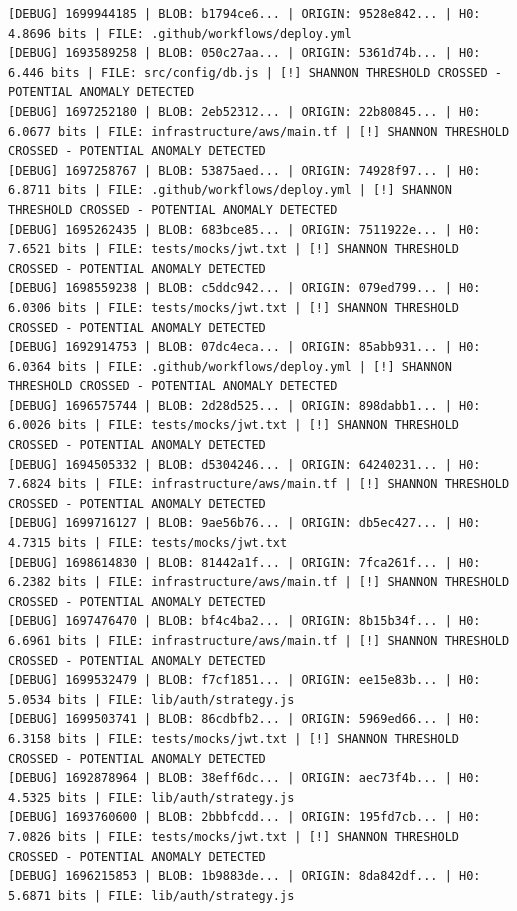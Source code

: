 \documentclass[12pt, a4paper, oneside]{report}
\begin{document}
\begin{lstlisting}[basicstyle=\tiny\ttfamily]
[DEBUG] 1699944185 | BLOB: b1794ce6... | ORIGIN: 9528e842... | H0: 4.8696 bits | FILE: .github/workflows/deploy.yml
[DEBUG] 1693589258 | BLOB: 050c27aa... | ORIGIN: 5361d74b... | H0: 6.446 bits | FILE: src/config/db.js | [!] SHANNON THRESHOLD CROSSED - POTENTIAL ANOMALY DETECTED
[DEBUG] 1697252180 | BLOB: 2eb52312... | ORIGIN: 22b80845... | H0: 6.0677 bits | FILE: infrastructure/aws/main.tf | [!] SHANNON THRESHOLD CROSSED - POTENTIAL ANOMALY DETECTED
[DEBUG] 1697258767 | BLOB: 53875aed... | ORIGIN: 74928f97... | H0: 6.8711 bits | FILE: .github/workflows/deploy.yml | [!] SHANNON THRESHOLD CROSSED - POTENTIAL ANOMALY DETECTED
[DEBUG] 1695262435 | BLOB: 683bce85... | ORIGIN: 7511922e... | H0: 7.6521 bits | FILE: tests/mocks/jwt.txt | [!] SHANNON THRESHOLD CROSSED - POTENTIAL ANOMALY DETECTED
[DEBUG] 1698559238 | BLOB: c5ddc942... | ORIGIN: 079ed799... | H0: 6.0306 bits | FILE: tests/mocks/jwt.txt | [!] SHANNON THRESHOLD CROSSED - POTENTIAL ANOMALY DETECTED
[DEBUG] 1692914753 | BLOB: 07dc4eca... | ORIGIN: 85abb931... | H0: 6.0364 bits | FILE: .github/workflows/deploy.yml | [!] SHANNON THRESHOLD CROSSED - POTENTIAL ANOMALY DETECTED
[DEBUG] 1696575744 | BLOB: 2d28d525... | ORIGIN: 898dabb1... | H0: 6.0026 bits | FILE: tests/mocks/jwt.txt | [!] SHANNON THRESHOLD CROSSED - POTENTIAL ANOMALY DETECTED
[DEBUG] 1694505332 | BLOB: d5304246... | ORIGIN: 64240231... | H0: 7.6824 bits | FILE: infrastructure/aws/main.tf | [!] SHANNON THRESHOLD CROSSED - POTENTIAL ANOMALY DETECTED
[DEBUG] 1699716127 | BLOB: 9ae56b76... | ORIGIN: db5ec427... | H0: 4.7315 bits | FILE: tests/mocks/jwt.txt
[DEBUG] 1698614830 | BLOB: 81442a1f... | ORIGIN: 7fca261f... | H0: 6.2382 bits | FILE: infrastructure/aws/main.tf | [!] SHANNON THRESHOLD CROSSED - POTENTIAL ANOMALY DETECTED
[DEBUG] 1697476470 | BLOB: bf4c4ba2... | ORIGIN: 8b15b34f... | H0: 6.6961 bits | FILE: infrastructure/aws/main.tf | [!] SHANNON THRESHOLD CROSSED - POTENTIAL ANOMALY DETECTED
[DEBUG] 1699532479 | BLOB: f7cf1851... | ORIGIN: ee15e83b... | H0: 5.0534 bits | FILE: lib/auth/strategy.js
[DEBUG] 1699503741 | BLOB: 86cdbfb2... | ORIGIN: 5969ed66... | H0: 6.3158 bits | FILE: tests/mocks/jwt.txt | [!] SHANNON THRESHOLD CROSSED - POTENTIAL ANOMALY DETECTED
[DEBUG] 1692878964 | BLOB: 38eff6dc... | ORIGIN: aec73f4b... | H0: 4.5325 bits | FILE: lib/auth/strategy.js
[DEBUG] 1693760600 | BLOB: 2bbbfcdd... | ORIGIN: 195fd7cb... | H0: 7.0826 bits | FILE: tests/mocks/jwt.txt | [!] SHANNON THRESHOLD CROSSED - POTENTIAL ANOMALY DETECTED
[DEBUG] 1696215853 | BLOB: 1b9883de... | ORIGIN: 8da842df... | H0: 5.6871 bits | FILE: lib/auth/strategy.js

\end{lstlisting}
\end{document}
